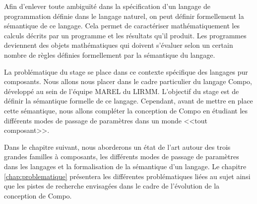  Afin d’enlever toute ambiguïté dans la spécification d'un langage de programmation définie dans le langage naturel, on peut définir formellement la sémantique de ce langage. Cela permet de caractériser mathématiquement les calculs décrits par un programme et les résultats qu'il produit. Les programmes deviennent des objets mathématiques qui doivent s'évaluer selon un certain nombre de règles définies formellement par la sémantique du langage.\\\par
  
  La problématique du stage se place dans ce contexte spécifique des langages pur composants. Nous allons nous placer dans le cadre particulier du langage Compo, développé au sein de l'équipe MAREL du LIRMM. L'objectif du stage est de définir la séman\-ti\-que formelle de ce langage. Cependant, avant de mettre en place cette sémantique, nous allons compléter la conception de Compo en étudiant les différents modes de passage de paramètres dans un monde <<tout composant>>. \\\par
  
  Dans le chapitre suivant, nous aborderons un état de l'art autour des trois grandes familles à composants, les différents modes de passage de paramètres dans les langages et la formalisation de la sémantique d’un langage. Le chapitre \ref{chap:problematique} présentera les différentes problématiques liées au sujet ainsi que les pistes de recherche envisagées dans le cadre de l'évolution de la conception de Compo. \\\par
  
  
  

